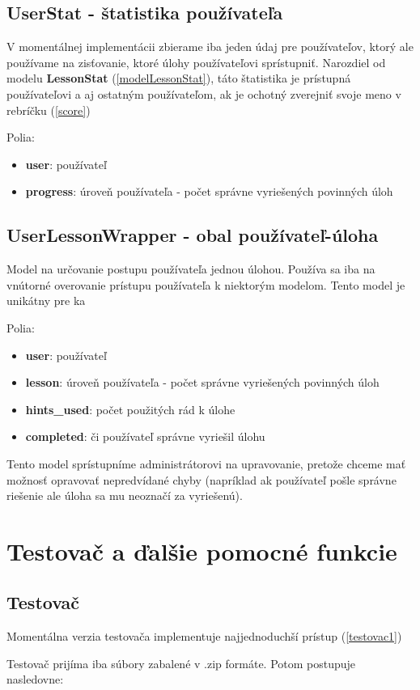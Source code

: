 \subsection{UserStat - štatistika používateľa}
\label{modelUserStat}
V momentálnej implementácii zbierame iba jeden údaj pre používateľov, ktorý ale používame
na zisťovanie, ktoré úlohy používateľovi sprístupniť. Narozdiel od modelu \textbf{LessonStat} (\ref{modelLessonStat}),
táto štatistika je prístupná používateľovi a aj ostatným používateľom, ak je ochotný zverejniť svoje
meno v rebríčku (\ref{score})

Polia:
\begin{itemize}
\item \textbf{user}: používateľ
\item \textbf{progress}: úroveň používateľa - počet správne vyriešených povinných úloh
\end{itemize}

\subsection{UserLessonWrapper - obal používateľ-úloha}
\label{modelWrapper}
Model na určovanie postupu používateľa jednou úlohou. Používa sa iba na vnútorné
overovanie prístupu používateľa k niektorým modelom. Tento model je unikátny pre ka

Polia:
\begin{itemize}
\item \textbf{user}: používateľ
\item \textbf{lesson}: úroveň používateľa - počet správne vyriešených povinných úloh
\item \textbf{hints\_used}: počet použitých rád k úlohe
\item \textbf{completed}: či používateľ správne vyriešil úlohu
\end{itemize}

Tento model sprístupníme administrátorovi na upravovanie, pretože chceme mať možnosť
opravovať nepredvídané chyby (napríklad ak používateľ pošle správne riešenie ale
úloha sa mu neoznačí za vyriešenú).

\section{Testovač a ďalšie pomocné funkcie}
\subsection{Testovač}
Momentálna verzia testovača implementuje najjednoduchší prístup (\ref{testovac1})

Testovač prijíma iba súbory zabalené v .zip formáte.
Potom postupuje nasledovne:
